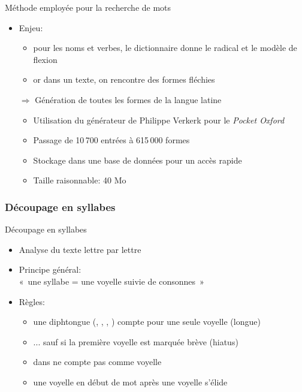 \documentclass{beamer}
\newcommand{\lettre}[1]{\emph{\structure{#1}}}
\begin{document}
\begin{frame}{Méthode employée pour la recherche de mots}

\begin{itemize}

\item Enjeu:

\begin{itemize}
\item pour les noms et verbes, le dictionnaire donne le radical et le modèle de flexion
\item or dans un texte, on rencontre des formes fléchies
\end{itemize}

\vfill

\item[$\Rightarrow$] Génération de toutes les formes de la langue latine

\begin{itemize}
\item Utilisation du générateur de Philippe Verkerk pour le \emph{Pocket Oxford}
\item Passage de 10\,700 entrées à 615\,000 formes
\item Stockage dans une base de données pour un accès rapide
\item Taille raisonnable: 40 Mo
\end{itemize}

\end{itemize}

\end{frame} %


\subsubsection{Découpage en syllabes}

\begin{frame}{Découpage en syllabes}

\begin{itemize}
\item Analyse du texte lettre par lettre
\item Principe général:\\ «~une syllabe = une voyelle suivie de consonnes~»
\item Règles:

\begin{itemize}
\item une diphtongue (\lettre{ae}, \lettre{oe}, \lettre{eu}, \lettre{au}) compte pour une seule voyelle (longue)
\item ... sauf si la première voyelle est marquée brève (hiatus)
\item \lettre{u} dans \lettre{qu} ne compte pas comme voyelle
\item une voyelle en début de mot après une voyelle s'élide
\end{itemize}

\end{itemize}
\end{frame} %
\end{document}
